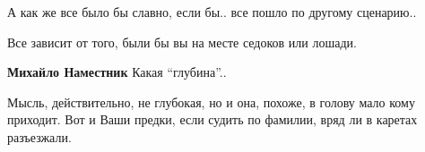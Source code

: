  
 
 
 
 

А как же все было бы славно, если бы.. все пошло по другому сценарию..

Все зависит от того, были бы вы на месте седоков или лошади.

\textbf{Михайло Наместник} Какая \enquote{глубина}..


Мысль, действительно, не глубокая, но и она, похоже, в голову мало кому
приходит. Вот и Ваши предки, если судить по фамилии, вряд ли в каретах
разъезжали.
